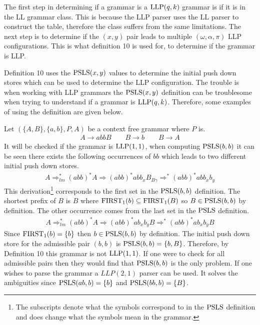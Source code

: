 The first step in determining if a grammar is a $\text{LLP}(q,k)$ grammar is if it is in the LL grammar class. This is because the LLP parser uses the LL parser to construct the table, therefore the class suffers from the same limitations. The next step is to determine if the $(x, y)$ pair leads to multiple $(\omega, \alpha, \pi)$ LLP configurations. This is what definition 10 \cite[13]{Vagner2007} is used for, to determine if the grammar is LLP.

Definition 10 \cite[13]{Vagner2007} uses the $\text{PSLS}(x, y)$ \cite[12]{Vagner2007} values to determine the initial push down stores which can be used to determine the LLP configuration. The trouble is when working with LLP grammars the $\text{PSLS}(x, y)$ definition can be troublesome when trying to understand if a grammar is $\text{LLP}(q, k)$. Therefore, some examples of using the definition are given below.

\begin{example}
    \label{ex:llp21}
    Let $(\{A, B\}, \{a, b\}, P, A)$ be a context free grammar where $P$ is.
    \begin{gather*}
        A \to a b b B \qquad B \to b \qquad B \to A
    \end{gather*}
    It will be checked if the grammar is $\text{LLP}(1, 1)$, when computing $\text{PSLS}(b,b)$ it can be seen there exists the following occurrences of $bb$ which leads to two different initial push down stores.
    \begin{align*}
        A \Rightarrow_{lm}^* (abb)^*A \Rightarrow (abb)^*abb_xB_{B\gamma} \Rightarrow^* (abb)^*abb_xb_y
    \end{align*}
    This derivation\footnote{The subscripts denote what the symbols correspond to in the $\text{PSLS}$ definition and does change what the symbols mean in the grammar.} corresponds to the first set in the $\text{PSLS}(b, b)$ definition. The shortest prefix of $B$ is $B$ where $\text{FIRST}_1(b) \subseteq \text{FIRST}_1(B)$ so $B \in \text{PSLS}(b,b)$ \cite[2]{errata:Vagner2007} by definition. The other occurrence comes from the last set in the $\text{PSLS}$ definition.
    \begin{align*}
        A \Rightarrow_{lm}^* (abb)^*A \Rightarrow (abb)^*ab_xb_yB \Rightarrow^* (abb)^*ab_xb_yB
    \end{align*}
    Since $\text{FIRST}_1(b) = \{b\}$ then $b \in \text{PSLS}(b, b)$ by definition. The initial push down store for the admissible pair $(b, b)$ is $\text{PSLS}(b, b) = \{b, B\}$. Therefore, by Definition 10 \cite[13]{Vagner2007} this grammar is not $\text{LLP}(1, 1)$. If one were to check for all admissible pairs then they would find that $\text{PSLS}(b,b)$ is the only problem. If one wishes to parse the grammar a $LLP(2, 1)$ parser can be used. It solves the ambiguities since $\text{PSLS}(ab, b) = \{b\}$ and $\text{PSLS}(bb, b) = \{B\}$.
\end{example}

